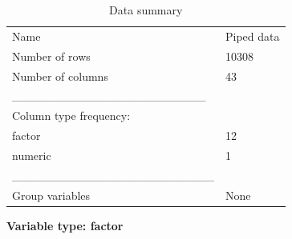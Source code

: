 \documentclass[
  letterpaper,
  DIV=11,
  numbers=noendperiod,
  oneside]{scrreprt}
\begin{document}
\begin{longtable}[]{@{}ll@{}}
\caption{Data summary}\tabularnewline
\toprule\noalign{}
\endfirsthead
\endhead
\bottomrule\noalign{}
\endlastfoot
Name & Piped data \\
Number of rows & 10308 \\
Number of columns & 43 \\
\_\_\_\_\_\_\_\_\_\_\_\_\_\_\_\_\_\_\_\_\_\_\_ & \\
Column type frequency: & \\
factor & 12 \\
numeric & 1 \\
\_\_\_\_\_\_\_\_\_\_\_\_\_\_\_\_\_\_\_\_\_\_\_\_ & \\
Group variables & None \\
\end{longtable}

\textbf{Variable type: factor}
\end{document}
